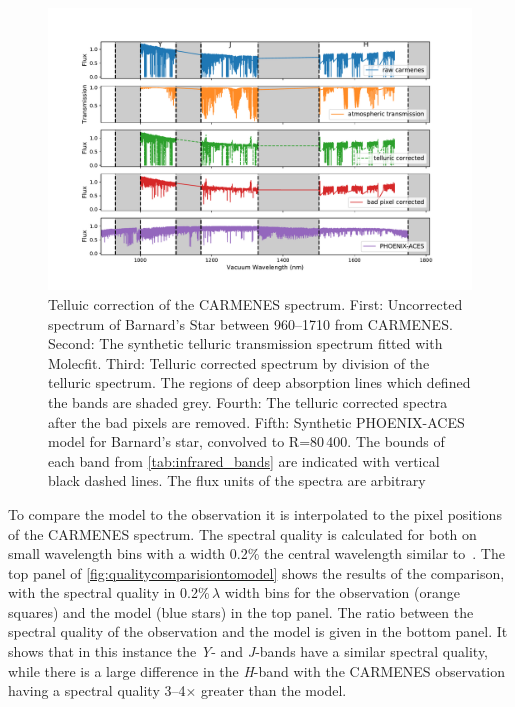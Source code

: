 \begin{figure}
    \centering
    \includegraphics[width=0.8\linewidth]{figures/information-content/Carmenes/bp_carmenes_masked_model_broadened}
    \caption[Telluic correction of the {CARMENES} \nir{} spectrum.]{Telluic correction of the {CARMENES} \nir{} spectrum.
        First: Uncorrected spectrum of Barnard's Star between 960--1710\nm{} from {CARMENES}.
        Second: The synthetic telluric transmission spectrum fitted with {Molecfit}.
        Third: Telluric corrected spectrum by division of the telluric spectrum.
        The regions of deep  absorption lines which defined the \nir{} bands are shaded grey.
        Fourth: The telluric corrected spectra after the bad pixels are removed.
        Fifth: Synthetic PHOENIX-ACES model for Barnard's star, convolved to R=80\,400.
        The bounds of each band from \cref{tab:infrared_bands} are indicated with vertical black dashed lines.
        The flux units of the spectra are arbitrary}
    \label{fig:carmenes_correction}
\end{figure}


To compare the model to the observation it is interpolated to the pixel positions of the {CARMENES} spectrum.
The spectral quality is calculated for both on small wavelength bins with a width 0.2\% the central wavelength similar to~\citet{artigau_optical_2018}.
The top panel of \cref{fig:qualitycomparisiontomodel} shows the results of the comparison, with the spectral quality in 0.2\%\,\(\lambda\) width bins for the observation (orange squares) and the model (blue stars) in the top panel.
The ratio between the spectral quality of the observation and the model is given in the bottom panel.
It shows that in this instance the \emph{Y}- and \emph{J}-bands have a similar spectral quality, while there is a large difference in the \emph{H}-band with the CARMENES observation having a spectral quality 3--4\(\times\) greater than the model.

